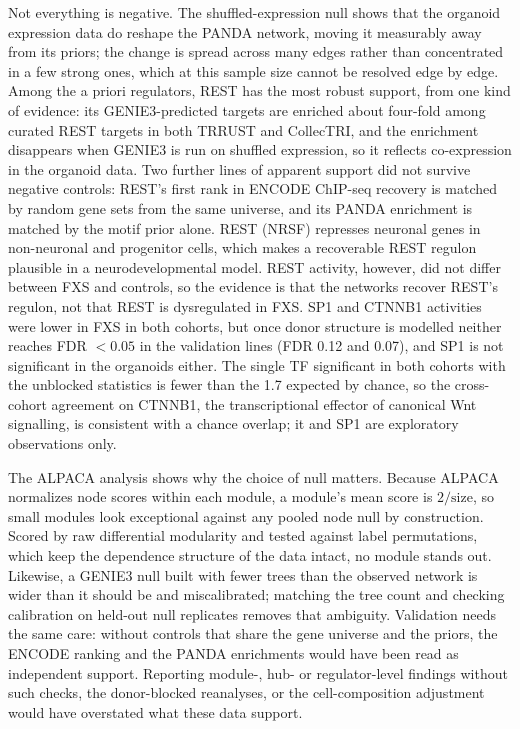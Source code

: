 \documentclass[journal]{IEEEtran}
\begin{document}
Not everything is negative. The shuffled-expression null shows that the organoid expression data do reshape the PANDA network, moving it measurably away from its priors; the change is spread across many edges rather than concentrated in a few strong ones, which at this sample size cannot be resolved edge by edge. Among the a priori regulators, REST has the most robust support, from one kind of evidence: its GENIE3-predicted targets are enriched about four-fold among curated REST targets in both TRRUST and CollecTRI, and the enrichment disappears when GENIE3 is run on shuffled expression, so it reflects co-expression in the organoid data. Two further lines of apparent support did not survive negative controls: REST's first rank in ENCODE ChIP-seq recovery is matched by random gene sets from the same universe, and its PANDA enrichment is matched by the motif prior alone. REST (NRSF) represses neuronal genes in non-neuronal and progenitor cells, which makes a recoverable REST regulon plausible in a neurodevelopmental model. REST activity, however, did not differ between FXS and controls, so the evidence is that the networks recover REST's regulon, not that REST is dysregulated in FXS. SP1 and CTNNB1 activities were lower in FXS in both cohorts, but once donor structure is modelled neither reaches FDR $<0.05$ in the validation lines (FDR 0.12 and 0.07), and SP1 is not significant in the organoids either. The single TF significant in both cohorts with the unblocked statistics is fewer than the 1.7 expected by chance, so the cross-cohort agreement on CTNNB1, the transcriptional effector of canonical Wnt signalling, is consistent with a chance overlap; it and SP1 are exploratory observations only.

The ALPACA analysis shows why the choice of null matters. Because ALPACA normalizes node scores within each module, a module's mean score is $2/\text{size}$, so small modules look exceptional against any pooled node null by construction. Scored by raw differential modularity and tested against label permutations, which keep the dependence structure of the data intact, no module stands out. Likewise, a GENIE3 null built with fewer trees than the observed network is wider than it should be and miscalibrated; matching the tree count and checking calibration on held-out null replicates removes that ambiguity. Validation needs the same care: without controls that share the gene universe and the priors, the ENCODE ranking and the PANDA enrichments would have been read as independent support. Reporting module-, hub- or regulator-level findings without such checks, the donor-blocked reanalyses, or the cell-composition adjustment would have overstated what these data support.
\end{document}
